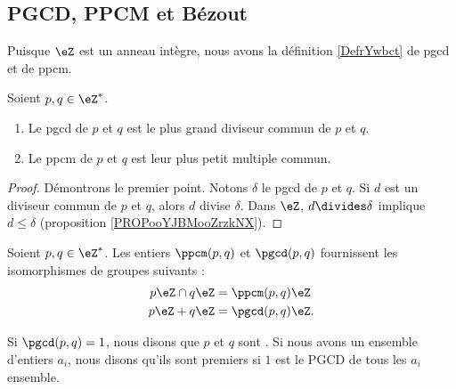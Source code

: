 \subsection{PGCD, PPCM et Bézout}

Puisque \( \eZ\) est un anneau intègre, nous avons la définition \ref{DefrYwbct} de pgcd et de ppcm.
\begin{proposition}       \label{PROPooAVRGooUfhjwF}
    Soient \( p,q\in\eZ^*\). 
    \begin{enumerate}
        \item
            Le pgcd de \( p\) et \( q\) est le plus grand diviseur commun de \( p\) et \( q\). 
        \item
            Le ppcm de \( p\) et \( q\) est leur plus petit multiple commun.
    \end{enumerate}
\end{proposition}

\begin{proof}
    Démontrons le premier point. Notons \( \delta\) le pgcd de \( p\) et \( q\). Si \( d\) est un diviseur commun de \( p\) et \( q\), alors \( d\) divise \( \delta\). Dans \( \eZ\), \( d\divides \delta\) implique \( d\leq\delta\) (proposition \ref{PROPooYJBMooZrzkNX}).
\end{proof}

\begin{lemma}
    Soient \( p,q\in\eZ^*\). Les entiers \( \ppcm(p,q)\) et \( \pgcd(p,q)\) fournissent les isomorphismes de groupes suivants :
\begin{subequations}
    \begin{align}
        p\eZ\cap q\eZ&=\ppcm(p,q)\eZ\\
        p\eZ + q\eZ&=\pgcd(p,q)\eZ.
    \end{align}
\end{subequations}
\end{lemma}

\begin{definition}  \label{DefZHRXooNeWIcB}
    Si \( \pgcd(p,q)=1\), nous disons que \( p\) et \( q\) sont . Si nous avons un ensemble d'entiers \( a_i\), nous disons qu'ils sont premiers  si \( 1\) est le PGCD de tous les \( a_i\) ensemble.
\end{definition}

